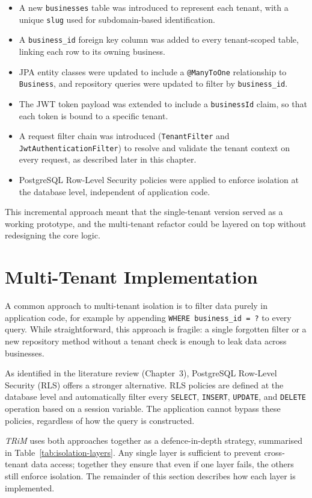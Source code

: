 \begin{itemize}
    \item A new \texttt{businesses} table was introduced to represent each tenant, with a unique \texttt{slug} used for subdomain-based identification.
    \item A \texttt{business\_id} foreign key column was added to every tenant-scoped table, linking each row to its owning business.
    \item JPA entity classes were updated to include a \texttt{@ManyToOne} relationship to \texttt{Business}, and repository queries were updated to filter by \texttt{business\_id}.
    \item The JWT token payload was extended to include a \texttt{businessId} claim, so that each token is bound to a specific tenant.
    \item A request filter chain was introduced (\texttt{TenantFilter} and \texttt{JwtAuthenticationFilter}) to resolve and validate the tenant context on every request, as described later in this chapter.
    \item PostgreSQL Row-Level Security policies were applied to enforce isolation at the database level, independent of application code.
\end{itemize}

This incremental approach meant that the single-tenant version served as a working prototype, and the multi-tenant refactor could be layered on top without redesigning the core logic.

\section{Multi-Tenant Implementation}
A common approach to multi-tenant isolation is to filter data purely in application code, for example by appending \texttt{WHERE business\_id = ?} to every query. While straightforward, this approach is fragile: a single forgotten filter or a new repository method without a tenant check is enough to leak data across businesses.

As identified in the literature review (Chapter~3), PostgreSQL Row-Level Security (RLS) offers a stronger alternative. RLS policies are defined at the database level and automatically filter every \texttt{SELECT}, \texttt{INSERT}, \texttt{UPDATE}, and \texttt{DELETE} operation based on a session variable. The application cannot bypass these policies, regardless of how the query is constructed.

\textit{TRiM} uses both approaches together as a defence-in-depth strategy, summarised in Table~\ref{tab:isolation-layers}. Any single layer is sufficient to prevent cross-tenant data access; together they ensure that even if one layer fails, the others still enforce isolation. The remainder of this section describes how each layer is implemented.

